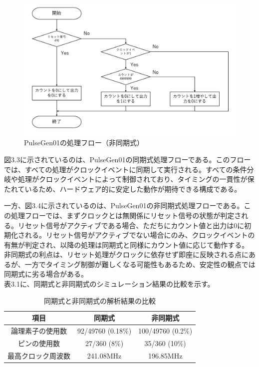 \documentclass{jlreq}
\numberwithin{equation}{section}
\begin{document}
\begin{figure}[H]
  \centering
  \includegraphics[width=\textwidth]{assets/flowchart02.png}
  \caption{PulseGen01の処理フロー（非同期式）}
\end{figure}

図3.3に示されているのは、PulseGen01の同期式処理フローである。このフローでは、すべての処理がクロックイベントに同期して実行される。すべての条件分岐や処理がクロックイベントによって制御されており、タイミングの一貫性が保たれているため、ハードウェア的に安定した動作が期待できる構成である。

一方、図3.4に示されているのは、PulseGen01の非同期式処理フローである。この処理フローでは、まずクロックとは無関係にリセット信号の状態が判定される。リセット信号がアクティブである場合、ただちにカウント値と出力は0に初期化される。リセット信号がアクティブでない場合にのみ、クロックイベントの有無が判定され、以降の処理は同期式と同様にカウント値に応じて動作する。非同期式の利点は、リセット処理がクロックに依存せず即座に反映される点にあるが、一方でタイミング制御が難しくなる可能性もあるため、安定性の観点では同期式に劣る場合がある。\\

表3.1に、同期式と非同期式のシミュレーション結果の比較を示す。

\begin{table}[H]
\centering
\caption{同期式と非同期式の解析結果の比較}
\begin{tabular}{|c|c|c|}
\hline
項目 & 同期式 & 非同期式 \\ \hline
論理素子の使用数 & 92/49760 (0.18\%) & 100/49760 (0.2\%) \\ \hline
ピンの使用数 & 27/360 (8\%) & 35/360 (10\%) \\ \hline
最高クロック周波数 & 241.08MHz & 196.85MHz \\ \hline
\end{tabular}
\end{table}
\end{document}
